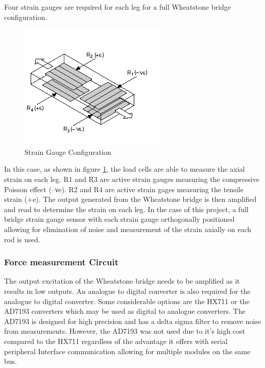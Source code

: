 Four strain gauges are required for each leg for a full Wheatstone bridge configuration. 
\begin{center}
	\begin{figure}[H]
		\centering
		\includegraphics{Figures/loadConf}
		\caption[Strain Gauge Configuration]{Strain Gauge Configuration \cite{noauthor_measuring_nodate}}
		\label{strain}
	\end{figure}
\end{center}
In this case, as shown in figure \ref{strain}, the load cells are able to measure the axial strain on each leg. R1 and R3 are active strain gauges measuring the compressive Poisson effect (–νe). R2 and R4 are active strain gages measuring the tensile strain (+e). The output generated from the Wheatstone bridge is then amplified and read to determine the strain on each leg.
In the case of this project, a full bridge strain gauge sensor with each strain gauge orthogonally positioned allowing for elimination of noise and measurement of the strain axially on each rod is used.

\subsubsection*{Force measurement Circuit}

The output excitation of the Wheatstone bridge needs to be amplified as it results in low outputs. An analogue to digital converter is also required for the analogue to digital converter. Some considerable options are the HX711 or the AD7193 converters which may be used as digital to analogue converters. The AD7193 is designed for high precision and has a delta sigma filter to remove noise from measurements.  However, the AD7193 was not used due to it's high cost compared to the HX711 regardless of the advantage it offers with serial peripheral Interface communication allowing for multiple modules on the same bus.

